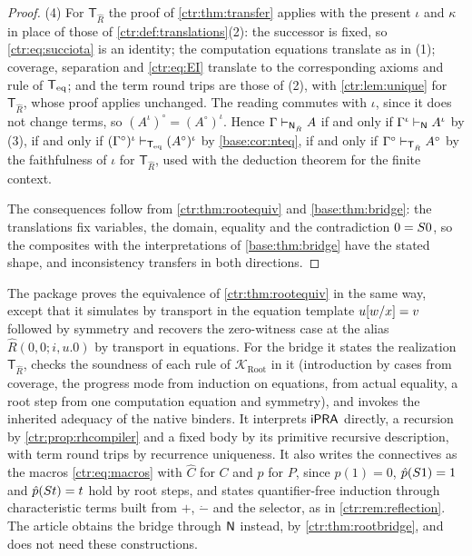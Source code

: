 \begin{proof}
(4) For $\mathsf T_{\hat R}$ the proof of \cref{ctr:thm:transfer} applies with the present
$\iota$ and $\kappa$ in place of those of \cref{ctr:def:translations}(2): the successor is fixed,
so \eqref{ctr:eq:succiota} is an identity; the computation equations translate as in (1); coverage,
separation and \eqref{ctr:eq:EI} translate to the corresponding axioms and rule of $\mathsf{T}_{\mathrm{eq}}$; and
the term round trips are those of (2), with \cref{ctr:lem:unique} for $\mathsf T_{\hat R}$,
whose proof applies unchanged. The reading commutes with $\iota$, since it does not change
terms, so $(A^\iota)^\circ=(A^\circ)^\iota$. Hence
$\Gamma\vdash_{\mathsf{N}_{\hat R}}A$ if and only if $\Gamma^\iota\vdash_{\mathsf{N}}A^\iota$ by (3), if
and only if $(\Gamma^\circ)^\iota\vdash_{\mathsf{T}_{\mathrm{eq}}}(A^\circ)^\iota$ by \cref{base:cor:nteq}, if and
only if $\Gamma^\circ\vdash_{\mathsf T_{\hat R}}A^\circ$ by the faithfulness of $\iota$ for
$\mathsf T_{\hat R}$, used with the deduction theorem for the finite context.

The consequences follow from \cref{ctr:thm:rootequiv} and \cref{base:thm:bridge}: the
translations fix variables, the domain, equality and the contradiction $0=S 0$, so the
composites with the interpretations of \cref{base:thm:bridge} have the stated shape, and
inconsistency transfers in both directions.
\end{proof}

\begin{remark}\label{ctr:rem:rootroute}
The package  proves the equivalence of \cref{ctr:thm:rootequiv} in the same way,
except that it simulates  by transport in the equation template
$u[w/x]=v$ followed by symmetry and recovers the zero-witness case at the alias
$\hat R(0,0;i,u.0)$ by transport in equations. For the bridge it states the realization
$\mathsf T_{\hat R}$, checks the soundness of each rule of $\mathcal K_{\mathrm{Root}}$ in it
(introduction by cases from coverage, the progress mode from induction on equations,
 from actual equality, a root step from one computation equation and
symmetry), and invokes the inherited adequacy of the native binders. It interprets
$\mathsf{iPRA}$ directly, a recursion by \cref{ctr:prop:rhcompiler} and a fixed body by its primitive
recursive description, with term round trips by recurrence uniqueness. It also writes the
connectives as the macros \eqref{ctr:eq:macros} with $\hat C$ for $C$ and $\hat p$ for $P$, since
$\hat p(1)=0$, $\hat p(S 1)=1$ and $\hat p(S t)=t$ hold by root steps, and states
quantifier-free induction through characteristic terms built from $+$, $\mathbin{\dot-}$ and
the selector, as in \cref{ctr:rem:reflection}. The article obtains the bridge through
$\mathsf{N}$ instead, by \cref{ctr:thm:rootbridge}, and does not need these constructions.
\end{remark}

